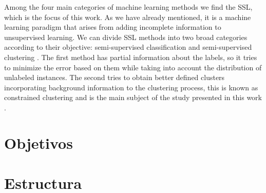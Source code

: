 Among the four main categories of machine learning methods we find the \acf{SSL}, which is the focus of this work. As we have already mentioned, it is a machine learning paradigm that arises from adding incomplete information to unsupervised learning. We can divide SSL methods into two broad categories according to their objective: semi-supervised classification and semi-supervised clustering \cite{chapelle2009semi}. The first method has partial information about the labels, so it tries to minimize the error based on them while taking into account the distribution of unlabeled instances. The second tries to obtain better defined clusters incorporating background information to the clustering process, this is known as constrained clustering and is the main subject of the study presented in this work \cite{triguero2015self}.

\section{Objetivos}


\section{Estructura}
































